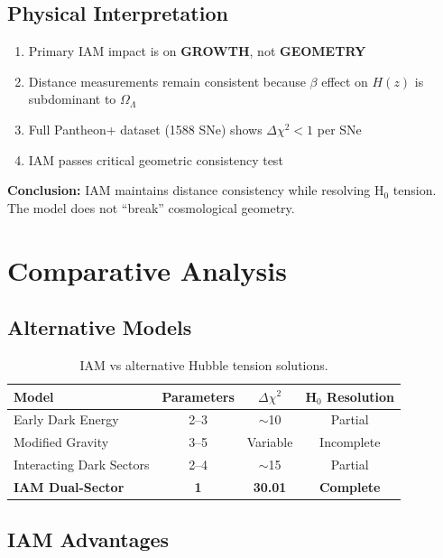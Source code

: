\documentclass[11pt,letterpaper]{article}
\begin{document}
\subsection{Physical Interpretation}

\begin{enumerate}
\item Primary IAM impact is on \textbf{GROWTH}, not \textbf{GEOMETRY}
\item Distance measurements remain consistent because $\beta$ effect on $H(z)$ is subdominant to $\Omega_\Lambda$
\item Full Pantheon+ dataset (1588 SNe) shows $\Delta\chi^2 < 1$ per SNe
\item IAM passes critical geometric consistency test
\end{enumerate}

\noindent\textbf{Conclusion:} IAM maintains distance consistency while resolving H$_0$ tension. The model does not ``break'' cosmological geometry.

\section{Comparative Analysis}

\subsection{Alternative Models}

\begin{table}[h]
\centering
\begin{tabular}{lccc}
\toprule
Model & Parameters & $\Delta\chi^2$ & H$_0$ Resolution \\
\midrule
Early Dark Energy & 2--3 & $\sim$10 & Partial \\
Modified Gravity & 3--5 & Variable & Incomplete \\
Interacting Dark Sectors & 2--4 & $\sim$15 & Partial \\
\midrule
\textbf{IAM Dual-Sector} & \textbf{1} & \textbf{30.01} & \textbf{Complete} \\
\bottomrule
\end{tabular}
\caption{IAM vs alternative Hubble tension solutions.}
\end{table}

\subsection{IAM Advantages}
\end{document}
